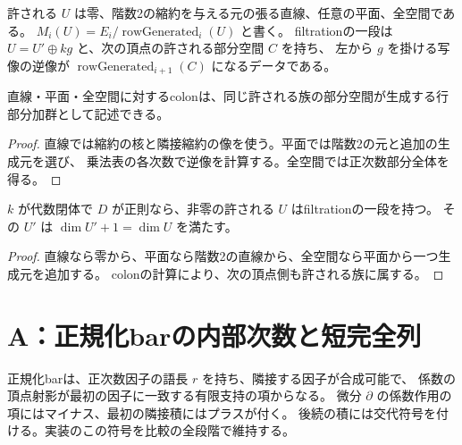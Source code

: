 \begin{definition}[許される部分空間とfiltrationの一段]\label{def:filtration}
\leanok
{}
許される $U$ は零、階数2の縮約を与える元の張る直線、任意の平面、全空間である。
$M_i(U)=E_i/\operatorname{rowGenerated}_i(U)$ と書く。
filtrationの一段は $U=U'\oplus kg$ と、次の頂点の許される部分空間 $C$ を持ち、
左から $g$ を掛ける写像の逆像が $\operatorname{rowGenerated}_{i+1}(C)$ になるデータである。
\end{definition}

\begin{lemma}[colonの計算]\label{lem:colon}
\leanok
{}
直線・平面・全空間に対するcolonは、同じ許される族の部分空間が生成する行部分加群として記述できる。
\end{lemma}
\begin{proof}\leanok
直線では縮約の核と隣接縮約の像を使う。平面では階数2の元と追加の生成元を選び、
乗法表の各次数で逆像を計算する。全空間では正次数部分全体を得る。
\end{proof}

\begin{lemma}[filtrationの存在]\label{lem:filtration-exists}
\leanok
{}
$k$ が代数閉体で $D$ が正則なら、非零の許される $U$ はfiltrationの一段を持つ。
その $U'$ は $\dim U' +1=\dim U$ を満たす。
\end{lemma}
\begin{proof}\leanok
直線なら零から、平面なら階数2の直線から、全空間なら平面から一つ生成元を追加する。
colonの計算により、次の頂点側も許される族に属する。
\end{proof}

\section{A：正規化barの内部次数と短完全列}

\begin{definition}[頂点条件付き正規化bar]\label{def:bar}
\leanok
{}
正規化barは、正次数因子の語長 $r$ を持ち、隣接する因子が合成可能で、
係数の頂点射影が最初の因子に一致する有限支持の項からなる。
微分 $\partial$ の係数作用の項にはマイナス、最初の隣接積にはプラスが付く。
後続の積には交代符号を付ける。実装のこの符号を比較の全段階で維持する。
\end{definition}

